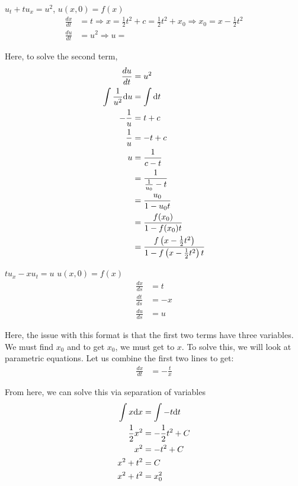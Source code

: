   \ex $u_t + tu_x = u^2$, $u(x, 0) = f(x)$
  \begin{align}
    \frac{dx}{dt} & = t \Rightarrow x = \frac{1}{2} t^2 + c
    = \frac{1}{2} t^2 + x_0 \Rightarrow x_0 = x - \frac{1}{2} t^2\\
    \frac{du}{dt} & = u^2 \Rightarrow u =
  \end{align}

  Here, to solve the second term,
  \begin{align}
    \frac{du}{dt} & = u^2\\
    \int \frac{1}{u^2} \text du & = \int \text dt\\
    -\frac{1}{u} & = t + c\\
    \frac{1}{u} & = -t + c\\
    u & = \frac{1}{c - t}\\
    & = \frac{1}{\frac{1}{u_0} - t}\\
    & = \frac{u_0}{1 - u_0 t}\\
    & = \frac{f(x_0)}{1 - f(x_0)t}\\
    & = \frac{f\left(x - \frac{1}{2}t^2\right)}
    {1 - f\left(x - \frac{1}{2}t^2\right)t}
  \end{align}


  \ex $tu_x - xu_t = u$ \quad $u(x, 0) = f(x)$
  \begin{align}
    \frac{dx}{ds} & = t\\
    \frac{dt}{ds} & = -x\\
    \frac{du}{ds} & = u
  \end{align}

  Here, the issue with this format is that the first two terms have three
  variables. We must find $x_0$ and to get $x_0$, we must get to $x$. To solve
  this, we will look at parametric equations. Let us combine the first two lines to get:
  \begin{align}
    \frac{dx}{dt} & = - \frac{t}{x}
  \end{align}

  From here, we can solve this via separation of variables
  \begin{align}
    \int x \text dx & = \int - t \text dt\\
    \frac{1}{2} x^2 & = -\frac{1}{2} t^2 + C\\
    x^2 & = - t^2 + C\\
    x^2 + t^2 & = C\\
    x^2 + t^2 & = x^2_0
  \end{align}

